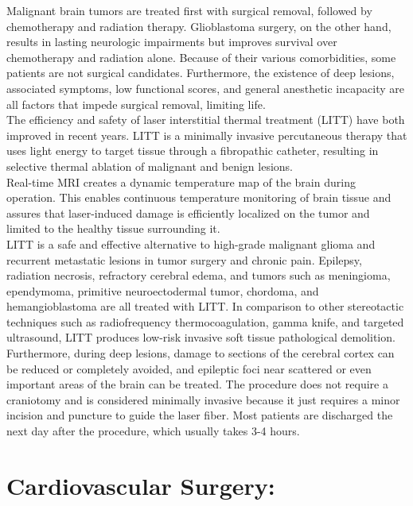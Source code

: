 \documentclass[12pt]{article}
\begin{document}
\hspace{2.5cm} Malignant brain tumors are treated first with surgical removal, followed by chemotherapy and radiation therapy. Glioblastoma surgery, on the other hand, results in lasting neurologic impairments but improves survival over chemotherapy and radiation alone. Because of their various comorbidities, some patients are not surgical candidates. Furthermore, the existence of deep lesions, associated symptoms, low functional scores, and general anesthetic incapacity are all factors that impede surgical removal, limiting life.\\
\indent
\hspace{2cm}The efficiency and safety of laser interstitial thermal treatment (LITT) have both improved in recent years. LITT is a minimally invasive percutaneous therapy that uses light energy to target tissue through a fibropathic catheter, resulting in selective thermal ablation of malignant and benign lesions.\\
\indent
\hspace{1.8cm}
Real-time MRI creates a dynamic temperature map of the brain during operation. This enables continuous temperature monitoring of brain tissue and assures that laser-induced damage is efficiently localized on the tumor and limited to the healthy tissue surrounding it.\\
\indent
\hspace{2cm} LITT is a safe and effective alternative to high-grade malignant glioma and recurrent metastatic lesions in tumor surgery and chronic pain. Epilepsy, radiation necrosis, refractory cerebral edema, and tumors such as meningioma, ependymoma, primitive neuroectodermal tumor, chordoma, and hemangioblastoma are all treated with LITT. In comparison to other stereotactic techniques such as radiofrequency thermocoagulation, gamma knife, and targeted ultrasound, LITT produces low-risk invasive soft tissue pathological demolition. Furthermore, during deep lesions, damage to sections of the cerebral cortex can be reduced or completely avoided, and epileptic foci near scattered or even important areas of the brain can be treated. The procedure does not require a craniotomy and is considered minimally invasive because it just requires a minor incision and puncture to guide the laser fiber. Most patients are discharged the next day after the procedure, which usually takes 3-4 hours.\\

\section{Cardiovascular Surgery:}
\end{document}
